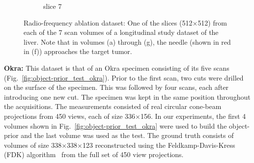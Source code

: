 \documentclass[journal]{IEEEtran}
\begin{document}
\begin{figure}[h!]
\begin{subfigure}[b]{0.23\linewidth}
 \caption{slice 7}
    \end{subfigure}     
     \caption{Radio-frequency ablation dataset: One of the slices (512$\times$512) from each of the 7 scan volumes of a longitudinal study dataset of the liver. Note that in volumes (a) through (g), the needle (shown in red in (f)) approaches the target tumor.} 
\label{fig:RFA2_test_object-prior}
\end{figure}


 \textbf{Okra:} This dataset is that of an Okra specimen consisting of
 its five scans (Fig.~\ref{fig:object-prior_test_okra}). Prior to the
 first scan, two cuts were drilled on the surface of the
 specimen. This was followed by four scans, each after introducing one
 new cut. The specimen was kept in the same position throughout the
 acquisitions. The measurements consisted of real circular cone-beam
 projections from 450 views, each of size 336$\times$156.
In our experiments, the first 4 volumes shown in
Fig.~\ref{fig:object-prior_test_okra} were used to build the
object-prior and the last volume was used as the test. The ground
truth consists of volumes of size 338$\times$338$\times$123
reconstructed using the Feldkamp-Davis-Kress (FDK)
algorithm~\cite{FDK} from the full set of 450 view projections.
\\
\end{document}
